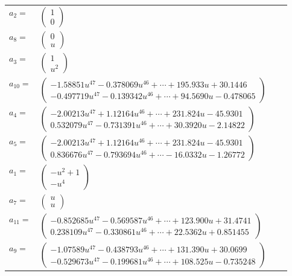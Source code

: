 \documentclass[1p]{elsarticle_modified}
\theoremstyle{definition}
\begin{document}
\begin{tabular}{m{7pt} m{180pt} m{7pt} m{180pt} }
\flushright $a_{2}=$&$\begin{pmatrix}1\\0\end{pmatrix}$ \\
\flushright $a_{8}=$&$\begin{pmatrix}0\\u\end{pmatrix}$ \\
\flushright $a_{3}=$&$\begin{pmatrix}1\\u^2\end{pmatrix}$ \\
\flushright $a_{10}=$&$\begin{pmatrix}-1.58851 u^{47}-0.378069 u^{46}+\cdots+195.933 u+30.1446\\-0.497719 u^{47}-0.139342 u^{46}+\cdots+94.5690 u-0.478065\end{pmatrix}$ \\
\flushright $a_{4}=$&$\begin{pmatrix}-2.00213 u^{47}+1.12164 u^{46}+\cdots+231.824 u-45.9301\\0.532079 u^{47}-0.731391 u^{46}+\cdots+30.3920 u-2.14822\end{pmatrix}$ \\
\flushright $a_{5}=$&$\begin{pmatrix}-2.00213 u^{47}+1.12164 u^{46}+\cdots+231.824 u-45.9301\\0.836676 u^{47}-0.793694 u^{46}+\cdots-16.0332 u-1.26772\end{pmatrix}$ \\
\flushright $a_{1}=$&$\begin{pmatrix}- u^2+1\\- u^4\end{pmatrix}$ \\
\flushright $a_{7}=$&$\begin{pmatrix}u\\u\end{pmatrix}$ \\
\flushright $a_{11}=$&$\begin{pmatrix}-0.852685 u^{47}-0.569587 u^{46}+\cdots+123.900 u+31.4741\\0.238109 u^{47}-0.330861 u^{46}+\cdots+22.5362 u+0.851455\end{pmatrix}$ \\
\flushright $a_{9}=$&$\begin{pmatrix}-1.07589 u^{47}-0.438793 u^{46}+\cdots+131.390 u+30.0699\\-0.529673 u^{47}-0.199681 u^{46}+\cdots+108.525 u-0.735248\end{pmatrix}$ \\

\end{tabular}
\end{document}
